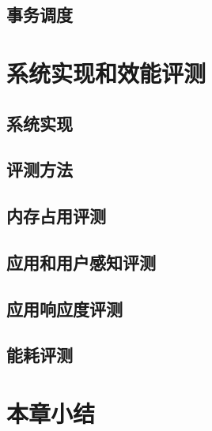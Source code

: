 \subsection{事务调度}
\label{subsec:sched}

\section{系统实现和效能评测}

\subsection{系统实现}

\subsection{评测方法}

\subsection{内存占用评测}
\label{subsec:eval-mem}

\subsection{应用和用户感知评测}

\subsection{应用响应度评测}

\subsection{能耗评测}
\label{subsec:energy}

\section{本章小结}

